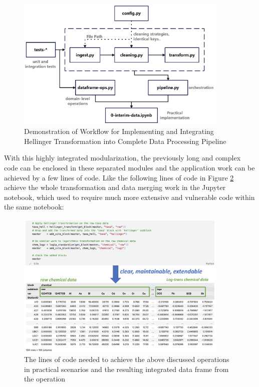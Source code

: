 \begin{figure}[!h]
    \centering
    \includegraphics[width=0.9\textwidth]{../results/preliminary_results/implementPlan_example_codebase.png}
    \caption{Demonstration of Workflow for Implementing and Integrating Hellinger Transformation into Complete Data Processing Pipeline}
    \label{fig:implementPlan_example_codebase}
\end{figure}

With this highly integrated modularization, the previously long and complex code can be enclosed in these
separated modules and the application work can be achieved by a few lines of code.
Like the following lines of code in Figure \textcolor{blue}{\ref{fig:example_lightweight_code_completed}} achieve the whole transformation and data merging work
in the Jupyter notebook, which used to require much more extensive and vulnerable code within the same notebook:

\begin{figure}[!h]
    \centering
    \includegraphics[width=0.9\textwidth]{../results/preliminary_results/example_lightweight_code_completed.png}
    \caption{The lines of code needed to achieve the above discussed operations in practical scenarios and the resulting integrated data frame from the operation}
    \label{fig:example_lightweight_code_completed}
\end{figure}




